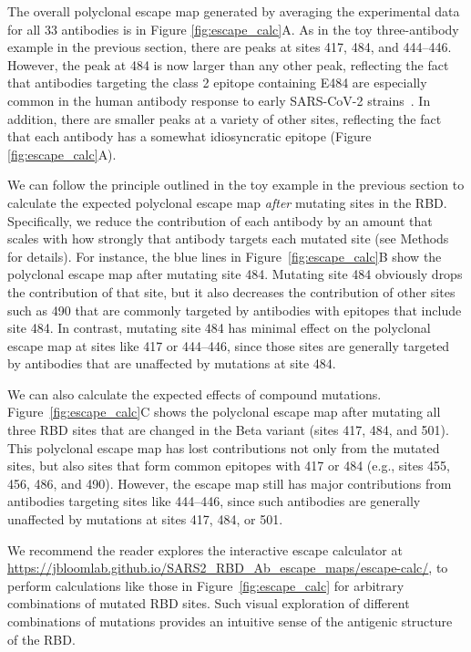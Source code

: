 \documentclass[9pt,twocolumn,twoside]{gsajnl_modified}
\begin{document}
The overall polyclonal escape map generated by averaging the experimental data for all 33 antibodies is in Figure \ref{fig:escape_calc}A.
As in the toy three-antibody example in the previous section, there are peaks at  sites 417, 484, and 444--446.
However, the peak at 484 is now larger than any other peak, reflecting the fact that antibodies targeting the class 2 epitope containing E484 are especially common in the human antibody response to early SARS-CoV-2 strains~\citep{yuan2020structural,robbiani2020convergent,greaney2021comprehensive,greaney2021mapping,chen2021convergent}.
In addition, there are smaller peaks at a variety of other sites, reflecting the fact that each antibody has a somewhat idiosyncratic epitope (Figure \ref{fig:escape_calc}A).

We can follow the principle outlined in the toy example in the previous section to calculate the expected polyclonal escape map \emph{after} mutating sites in the RBD.
Specifically, we reduce the contribution of each antibody by an amount that scales with how strongly that antibody targets each mutated site (see Methods for details).
For instance, the blue lines in Figure~\ref{fig:escape_calc}B show the polyclonal escape map after mutating site 484.
Mutating site 484 obviously drops the contribution of that site, but it also decreases the contribution of other sites such as 490 that are commonly targeted by antibodies with epitopes that include site 484.
In contrast, mutating site 484 has minimal effect on the polyclonal escape map at sites like 417 or 444--446, since those sites are generally targeted by antibodies that are unaffected by mutations at site 484.

We can also calculate the expected effects of compound mutations.
Figure~\ref{fig:escape_calc}C shows the polyclonal escape map after mutating all three RBD sites that are changed in the Beta variant (sites 417, 484, and 501).
This polyclonal escape map has lost contributions not only from the mutated sites, but also sites that form common epitopes with 417 or 484 (e.g., sites 455, 456, 486, and 490).
However, the escape map still has major contributions from antibodies targeting sites like 444--446, since such antibodies are generally unaffected by mutations at sites 417, 484, or 501.

We recommend the reader explores the interactive escape calculator at \url{https://jbloomlab.github.io/SARS2_RBD_Ab_escape_maps/escape-calc/}, to perform calculations like those in Figure~\ref{fig:escape_calc} for arbitrary combinations of mutated RBD sites.
Such visual exploration of different combinations of mutations provides an intuitive sense of the antigenic structure of the RBD.
\end{document}

